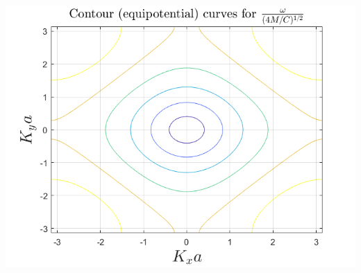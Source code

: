 \documentclass{article}
\begin{document}
\begin{center}
    \includegraphics[scale = 0.6]{equipotentialcurves.png}
\end{center}
\end{document}
